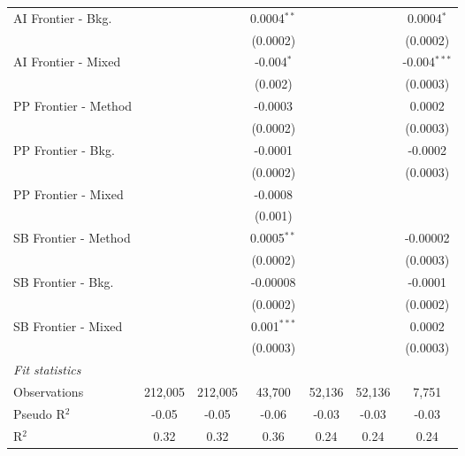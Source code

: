 \begin{tabular}{lcccccc}
   AI Frontier - Bkg.   &               &                & 0.0004$^{**}$  &                &                & 0.0004$^{*}$\\   
                        &               &                & (0.0002)       &                &                & (0.0002)\\   
   AI Frontier - Mixed  &               &                & -0.004$^{*}$   &                &                & -0.004$^{***}$\\   
                        &               &                & (0.002)        &                &                & (0.0003)\\   
   PP Frontier - Method &               &                & -0.0003        &                &                & 0.0002\\   
                        &               &                & (0.0002)       &                &                & (0.0003)\\   
   PP Frontier - Bkg.   &               &                & -0.0001        &                &                & -0.0002\\   
                        &               &                & (0.0002)       &                &                & (0.0003)\\   
   PP Frontier - Mixed  &               &                & -0.0008        &                &                &   \\   
                        &               &                & (0.001)        &                &                &   \\   
   SB Frontier - Method &               &                & 0.0005$^{**}$  &                &                & -0.00002\\   
                        &               &                & (0.0002)       &                &                & (0.0003)\\   
   SB Frontier - Bkg.   &               &                & -0.00008       &                &                & -0.0001\\   
                        &               &                & (0.0002)       &                &                & (0.0002)\\   
   SB Frontier - Mixed  &               &                & 0.001$^{***}$  &                &                & 0.0002\\   
                        &               &                & (0.0003)       &                &                & (0.0003)\\   
   \midrule
   \emph{Fit statistics}\\
   Observations         & 212,005       & 212,005        & 43,700         & 52,136         & 52,136         & 7,751\\  
   Pseudo R$^2$         & -0.05         & -0.05          & -0.06          & -0.03          & -0.03          & -0.03\\  
   R$^2$                & 0.32          & 0.32           & 0.36           & 0.24           & 0.24           & 0.24\\  
   

\end{tabular}
